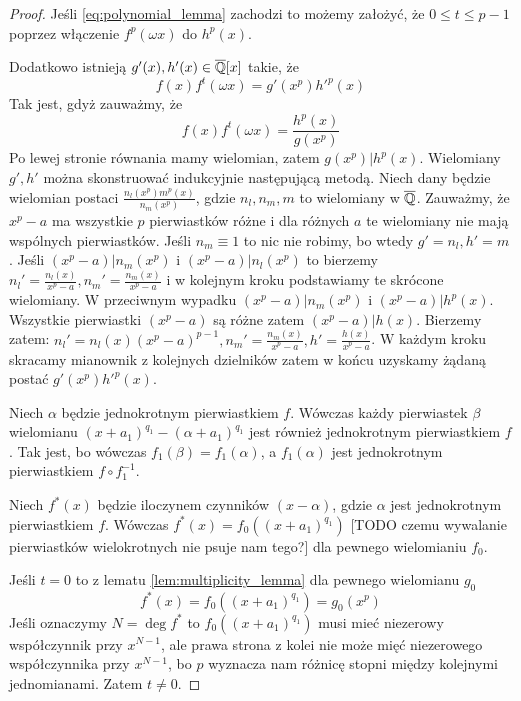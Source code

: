 \begin{proof}
  Jeśli \ref{eq:polynomial_lemma} zachodzi to możemy założyć, że $0 \leq t \leq p - 1$
  poprzez włączenie $f^p(\omega x)$ do $h^p(x)$.

  Dodatkowo istnieją $g'(x), h'(x) \in \overline{\mathbb{Q}}[x]$ takie, że
  \begin{equation}
    f(x) f^t(\omega x) = g' \left( x^p \right) h'^p(x)
    \label{eq:polynomial_lemma_right}
  \end{equation}
  Tak jest, gdyż zauważmy, że
  \[ f(x) f^t(\omega x) = \frac{h^p(x)}{g \left( x^p \right)} \]
  Po lewej stronie równania mamy wielomian, zatem $g \left( x^p \right) |
  h^p(x)$. Wielomiany $g', h'$ można skonstruować indukcyjnie następującą
  metodą. Niech dany będzie wielomian postaci
  $\frac{n_l \left( x^p \right) m^p(x)}{n_m \left( x^p \right)}$, gdzie $n_l,
  n_m, m$ to wielomiany w $\overline{\mathbb{Q}}$. Zauważmy, że $x^p - a$ ma wszystkie
  $p$ pierwiastków różne i dla różnych $a$ te wielomiany nie mają wspólnych
  pierwiastków. Jeśli $n_m \equiv 1$ to nic nie robimy, bo wtedy $g' = n_l, h' =
  m$.
  Jeśli $\left(x^p - a \right) | n_m \left(x^p\right)$ i $\left(x^p - a \right)
  | n_l \left(x^p\right)$ to bierzemy
  $n_l' = \frac{n_l(x)}{x^p - a}, n_m' = \frac{n_m(x)}{x^p - a}$ i w kolejnym
  kroku podstawiamy te skrócone wielomiany.
  W przeciwnym wypadku
  $\left(x^p - a \right) | n_m \left(x^p \right)$ i
  $\left(x^p - a \right) | h^p \left(x \right)$. Wszystkie pierwiastki
  $\left(x^p - a \right)$ są różne zatem $\left(x^p - a \right) | h(x)$.
  Bierzemy zatem:
  $n_l' = n_l(x)\left(x^p - a \right)^{p-1}, n_m' = \frac{n_m(x)}{x^p -
  a}, h' = \frac{h(x)}{x^p - a}$.
  W każdym kroku skracamy mianownik z kolejnych dzielników zatem w końcu
  uzyskamy żądaną postać $g'\left(x^p \right) h'^p(x)$.

  Niech $\alpha$ będzie jednokrotnym pierwiastkiem $f$. Wówczas każdy
  pierwiastek $\beta$ wielomianu $\left(x + a_1\right)^{q_1} - \left(\alpha +
  a_1\right)^{q_1}$ jest również jednokrotnym pierwiastkiem $f$. Tak jest, bo
  wówczas $f_1(\beta) = f_1(\alpha)$, a $f_1(\alpha)$ jest jednokrotnym
  pierwiastkiem $f \circ f_1^{-1}$.

  Niech $f^*(x)$ będzie iloczynem czynników $(x-\alpha)$, gdzie $\alpha$ jest
  jednokrotnym pierwiastkiem $f$. Wówczas $f^*(x) = f_0 \left( \left(x + a_1
  \right)^{q_1} \right)$ [TODO czemu wywalanie pierwiastków wielokrotnych nie
  psuje nam tego?] dla pewnego wielomianiu $f_0$.

  Jeśli $t=0$ to z lematu \ref{lem:multiplicity_lemma} dla pewnego wielomianu
  $g_0$
  \begin{equation}
   f^*(x) = f_0 \left(\left(x + a_1 \right)^{q_1} \right) = g_0 \left( x^p
  \right)
  \label{eq:polynomial_lemma_only_g}
\end{equation}
  Jeśli oznaczymy $N = \deg f^*$ to $f_0 \left(\left(x + a_1 \right)^{q_1}
  \right)$ musi mieć niezerowy współczynnik przy $x^{N-1}$, ale prawa strona z
  kolei nie może mięć niezerowego współczynnika przy $x^{N-1}$, bo $p$ wyznacza
  nam różnicę stopni między kolejnymi jednomianami. Zatem $t \neq 0$.


\end{proof}
